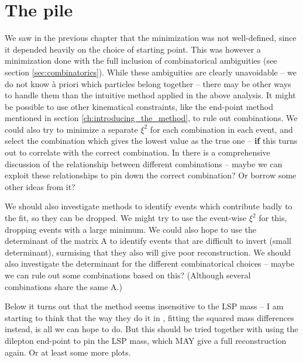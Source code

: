\documentclass[twoside,english]{uiofysmaster}
\begin{document}
\clearpage
\section{The pile}



We saw in the previous chapter that the minimization was not well-defined, since it depended heavily on the choice of starting point. This was however a minimization done with the full inclusion of combinatorical ambiguities (see section \ref{sec:combinatorics}). While these ambiguities are clearly unavoidable -- we do not know \`{a} priori which particles belong together -- there may be other ways to handle them than the intuitive method applied in the above analysis. It might be possible to use other kinematical constraints, like the end-point method mentioned in section \ref{ch:introducing_the_method}, to rule out combinations. We could also try to minimize a separate $\xi^2$ for each combination in each event, and select the combination which gives the lowest value as the true one -- {\bf if} this turns out to correlate with the correct combination. In \cite{Gripaios:2011jm} there is a comprehensive discussion of the relationship between different combinations -- maybe we can exploit these relationships to pin down the correct combination? Or borrow some other ideas from it?

We should also investigate methods to identify events which contribute badly to the fit, so they can be dropped. We might try to use the event-wise $\xi^2$ for this, dropping events with a large minimum. We could also hope to use the determinant of the matrix A to identify events that are difficult to invert (small determinant), surmising that they also will give poor reconstruction. We should also investigate the determinant for the different combinatorical choices -- maybe we can rule out some combinations based on this? (Although several combinations share the same A.)

Below it turns out that the method seems insensitive to the LSP mass -- I am starting to think that the way they do it in \cite{Nojiri:2010dk}, fitting the squared mass differences instead, is all we can hope to do. But this should be tried together with using the dilepton end-point to pin the LSP mass, which MAY give a full reconstruction again. Or at least some more plots.
\end{document}
